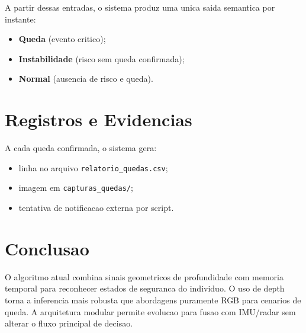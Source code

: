 \documentclass[12pt,a4paper]{article}
\begin{document}
A partir dessas entradas, o sistema produz uma unica saida semantica por instante:
\begin{itemize}
    \item \textbf{Queda} (evento critico);
    \item \textbf{Instabilidade} (risco sem queda confirmada);
    \item \textbf{Normal} (ausencia de risco e queda).
\end{itemize}

\section{Registros e Evidencias}
A cada queda confirmada, o sistema gera:
\begin{itemize}
    \item linha no arquivo \texttt{relatorio\_quedas.csv};
    \item imagem em \texttt{capturas\_quedas/};
    \item tentativa de notificacao externa por script.
\end{itemize}

\section{Conclusao}
O algoritmo atual combina sinais geometricos de profundidade com memoria temporal para reconhecer estados de seguranca do individuo. O uso de depth torna a inferencia mais robusta que abordagens puramente RGB para cenarios de queda. A arquitetura modular permite evolucao para fusao com IMU/radar sem alterar o fluxo principal de decisao.
\end{document}
